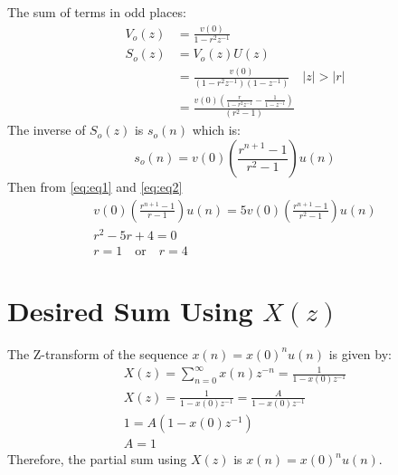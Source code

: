 \documentclass{article}
\begin{document}
The sum of terms in odd places:
\begin{align}
V_o(z) &= \frac{v(0)}{1-r^2z^{-1}} \\
S_o(z) &= V_o(z)U(z) \\
       &= \frac{v(0)}{(1-r^2z^{-1})(1-z^{-1})} \quad \lvert z \rvert > \lvert r \rvert \\
       &= \frac{v(0)\left(\frac{r}{1-r^2z^{-1}}-\frac{1}{1-z^{-1}}\right)}{(r^2-1)}
\end{align}
The inverse of $S_o(z)$ is $s_o(n)$ which is:
\begin{equation}
s_o(n) = v(0)\left(\frac{r^{n+1}-1}{r^2-1}\right)u(n)
\label{eq:eq2}
\end{equation}
Then from \eqref{eq:eq1} and \eqref{eq:eq2}
\begin{align}
v(0)(\frac{r^{n+1}-1}{r-1})u(n)=5v(0)(\frac{r^{n+1}-1}{r^2-1})u(n)\\
r^2-5r+4=0\\
r=1 \quad \text{or} \quad r=4
\end{align}
\section*{Desired Sum Using $X(z)$}
The Z-transform of the sequence \( x(n) = x(0)^n u(n) \) is given by:
\begin{align}
X(z) = \sum_{n=0}^{\infty} x(n)z^{-n} = \frac{1}{1 - x(0)z^{-1}}\\
X(z) = \frac{1}{1 - x(0)z^{-1}} = \frac{A}{1 - x(0)z^{-1}}\\
1 = A(1 - x(0)z^{-1}) \\
A=1
\end{align}
Therefore, the partial sum using \(X(z)\) is \(x(n) = x(0)^n u(n)\).
\end{document}
